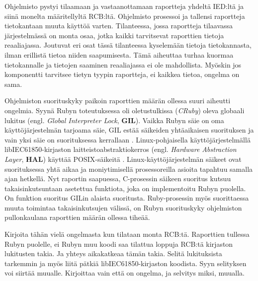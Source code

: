 Ohjelmisto pystyi tilaamaan ja vastaanottamaan raportteja yhdeltä IED:ltä ja siinä monelta määritellyltä RCB:ltä. Ohjelmisto prosessoi ja tallensi raportteja tietokantaan muuta käyttöä varten. Tilanteessa, jossa raportteja tilaavassa järjestelmässä on monta osaa, jotka kaikki tarvitsevat raporttien tietoja reaaliajassa. Joutuvat eri osat tässä tilanteessa kyselemään tietoja tietokannasta, ilman erillistä tietoa niiden saapumisesta. Tämä aiheuttaa turhaa kuormaa tietokannalle ja tietojen saaminen reaaliajassa ei ole mahdollista. Myöskin jos komponentti tarvitsee tietyn tyypin raportteja, ei kaikkea tietoa, ongelma on sama.

Ohjelmiston suorituskyky paikoin raporttien määrän ollessa suuri aiheutti ongelmia. Syynä Rubyn toteutuksessa oli oletustulkissa (\emph{CRuby}) oleva globaali lukitus (engl. \emph{Global Interpreter Lock}, \textbf{GIL}). Vaikka Rubyn säie on oma käyttöjärjestelmän tarjoama säie, GIL estää säikeiden yhtäaikaisen suorituksen ja vain yksi säie on suorituksessa kerrallaan \mbox{\cite[s.~131--133]{Odaira2014}}. Linux-pohjaisella käyttöjärjestelmällä libIEC61850-kirjaston laitteistoabstraktiokerros (engl. \emph{Hardware Abstraction Layer}, \textbf{HAL}) käyttää POSIX-säikeitä \cite{libIEC61850-repo}. Linux-käyttöjärjestelmän säikeet ovat suorituksessa yhtä aikaa ja moniytimisellä prosessoreilla asioita tapahtuu samalla ajan hetkellä. Nyt raportin saapuessa, C-prosessin säikeen suoritus kutsuu takaisinkutsuntaan asetettua funktiota, joka on implementoitu Rubyn puolella. On funktion suoritus GILin alaista suoritusta. Ruby-prosessin myös suorittaessa muuta toimintaa takaisinkutsujen välissä, on Rubyn suorituskyky ohjelmiston pullonkaulana raporttien määrän ollessa tiheää.

\begin{it}
	Kirjoita tähän vielä ongelmasta kun tilataan monta RCB:tä. Raporttien tullessa Rubyn puolelle, ei Rubyn muu koodi saa tilattua loppuja RCB:tä kirjaston lukitusten takia. Ja yhteys aikakatkeaa tämän takia. Selitä lukituksista tarkemmin ja myös liitä pätkiä libIEC61850-kirjaston koodista. Syyn selityksen voi siirtää muualle. Kirjoittaa vain että on ongelma, ja selvitys miksi, muualla.
\end{it}


